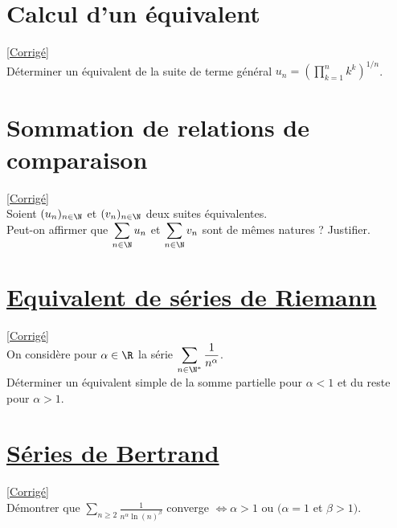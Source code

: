 \documentclass{book}
\begin{document}
	\section{Calcul d'un équivalent }
	\textcolor{blue}{\hyperref[Calcul d'un équivalent corrigé]{[Corrigé]}}\\
	\label{Calcul d'un équivalent}
	Déterminer un équivalent de la suite de terme général $u_n=\left(\displaystyle\prod\limits_{k=1}^nk^k\right)^{1/n}$.
	
	\section{Sommation de relations de comparaison }
	\textcolor{blue}{\hyperref[sec:sommation-de-relations-de-comparaison]{[Corrigé]}}\\
	\label{Sommation de relations de comparaison}
	Soient $(u_n)_{n\in \N}$ et $(v_n)_{n\in \N}$ deux suites équivalentes.\\
	Peut-on affirmer que $\displaystyle\sum\limits_{n\in \N}u_n$ et $\displaystyle\sum\limits_{n\in \N}v_n$ sont de mêmes natures ? Justifier.
	
	\section{\underline{Equivalent de séries de Riemann} }
	\textcolor{blue}{\hyperref[sec:equivalent-de-series-de-riemann]{[Corrigé]}}\\
	\label{Equivalent de séries de Riemann}
	On considère pour $\alpha\in \R$ la série $\displaystyle\sum_{n\in \N^*}\frac{1}{n^\alpha}$.\\
	Déterminer un équivalent simple de la somme partielle pour $\alpha<1$ et du reste pour $\alpha>1$.
	
	\section{\underline{Séries de Bertrand} }
	\textcolor{blue}{\hyperref[sec:series-de-bertrand]{[Corrigé]}}\\
	\label{Séries de Bertrand}
	Démontrer que $\displaystyle\sum\limits_{n\geq 2}\frac{1}{n^\alpha\ln(n)^\beta}$ converge $\iff\alpha>1$ ou $(\alpha=1$ et $\beta >1)$.
	
\end{document}
